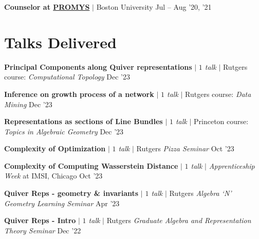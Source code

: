 \resumeProjectHeading
{\textbf{Counselor at \href{https://promys.org}{PROMYS}} $|$ Boston University }
{Jul -- Aug '20, '21}


\resumeSubHeadingListEnd



\section{Talks Delivered}
\resumeSubHeadingListStart

\resumeProjectHeading
{\textbf{Principal Components along Quiver representations} $|$ \emph{$1$ talk} $|$ Rutgers course: \textit {Computational Topology}}
{Dec '23}
{}
\vspace{\mygap}

\resumeProjectHeading
{\textbf{Inference on growth process of a network} $|$ \emph{$1$ talk} $|$ Rutgers course: \textit{Data Mining}}
{Dec '23}
{}
\vspace{\mygap}

\resumeProjectHeading
{\textbf{Representations as sections of Line Bundles} $|$ \emph{$1$ talk} $|$ Princeton course: \textit{Topics in Algebraic Geometry}}
{Dec '23}
{}
\vspace{\mygap}

\resumeProjectHeading
{\textbf{Complexity of Optimization} $|$ \emph{$1$ talk} $|$ Rutgers \textit{Pizza Seminar}}
{Oct '23}
{}
\vspace{\mygap}

\resumeProjectHeading
{\textbf{Complexity of Computing Wasserstein Distance} $|$ \emph{$1$ talk} $|$ \textit{Apprenticeship Week} at IMSI, Chicago }
{Oct '23}
{}
\vspace{\mygap}



\resumeProjectHeading
{\textbf{Quiver Reps -  geometry \& invariants} $|$ \emph{$1$ talk} $|$ Rutgers \textit{Algebra `N' Geometry Learning Seminar}}
{Apr '23}
{}
\vspace{\mygap}

\resumeProjectHeading
{\textbf{Quiver Reps - Intro} $|$ \emph{$1$ talk} $|$ Rutgers \textit{Graduate Algebra and Representation Theory Seminar}}
{Dec '22}
{}
\vspace{\mygap}

